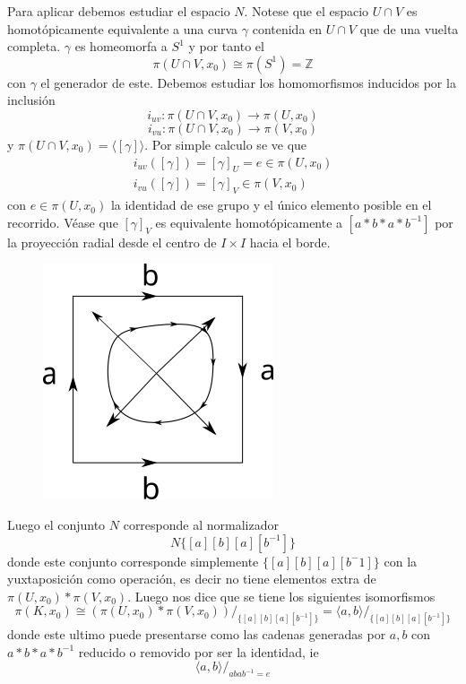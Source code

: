 \begin{ejemplo}
  Para aplicar \vank debemos estudiar el espacio \(N\). Notese que el
  espacio \(U \cap V\) es homotópicamente equivalente a una curva
  \(\gamma\) contenida en \(U \cap V\) que de una vuelta completa.
  \(\gamma\) es homeomorfa a \(S^1\) y por tanto el
  \[\pi (U \cap V, x_0) \cong \pi (S^1) = \mathbb Z \]
  con \(\gamma\) el generador de este. Debemos estudiar los
  homomorfismos inducidos por la inclusión
  \[ i_{u v} : \pi (U \cap V , x_0) \longrightarrow \pi (U, x_0) \]
  \[ i_{v u} : \pi (U \cap V , x_0) \longrightarrow \pi (V, x_0) \]
  y \(  \pi (U \cap V , x_0) = \langle {[\gamma]} \rangle \). Por
  simple calculo se ve que
  \begin{gather*}
    i_{u v} ([\gamma]) = [\gamma]_{U} = e \in \pi \left( U, x_0 \right)
    \\
    i_{v u} ([\gamma]) = [\gamma]_{V} \in \pi \left( V, x_0 \right)
  \end{gather*}
  con \(e \in \pi \left( U, x_0 \right)\) la identidad de ese grupo y el
  único elemento posible en el recorrido. Véase que \([\gamma]_V\) es
  equivalente homotópicamente a \([a * b * a * b^{-1}]\) por la proyección
  radial desde el centro de \(I \times I\) hacia el borde.
  \begin{figure}[h]
    \centering \includegraphics[scale=0.5]{./imagenes/radial.png}
  \end{figure}
  Luego el conjunto \(N\) corresponde al normalizador
  \[ N \{ [a] [b] [a] [b^{-1}]\}\]
  donde este conjunto corresponde simplemente \(\{ [a] [b] [a]
  [b^-1]\}\) con la yuxtaposición como operación, es decir no tiene
  elementos extra de \(\pi (U,x_0) * \pi (V, x_0)\). Luego \vank nos
  dice que se tiene los siguientes isomorfismos
  \[ \pi (K, x_0) \cong \left( \pi (U, x_0) * \pi (V, x_0) \right)
      /_{\{[a] [b] [a] [b^{-1}]\}} = \langle {a , b} \rangle
      /_{\{[a] [b] [a] [b^{-1}]\}}\]
  donde este ultimo puede presentarse como las cadenas generadas por
  \(a,b\) con \(a * b * a * b^{-1} \) reducido o removido por ser la
  identidad, ie
  \[ \langle a,b \rangle /_{abab^{-1} = e} \]
\end{ejemplo}

